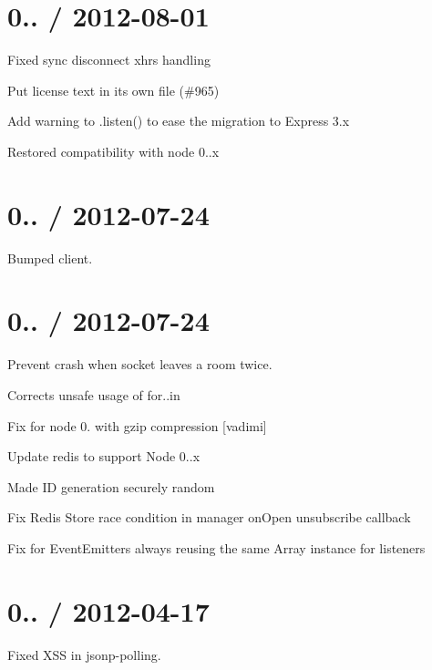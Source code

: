 \section*{0.. / 2012-\/08-\/01 }


\begin{DoxyItemize}
\item Fixed sync disconnect xhrs handling
\item Put license text in its own file (\#965)
\item Add warning to .listen() to ease the migration to Express 3.\+x
\item Restored compatibility with node 0..\+x
\end{DoxyItemize}

\section*{0.. / 2012-\/07-\/24 }


\begin{DoxyItemize}
\item Bumped client.
\end{DoxyItemize}

\section*{0.. / 2012-\/07-\/24 }


\begin{DoxyItemize}
\item Prevent crash when socket leaves a room twice.
\item Corrects unsafe usage of for..in
\item Fix for node 0. with {\ttfamily gzip compression} \mbox{[}vadimi\mbox{]}
\item Update redis to support Node 0..\+x
\item Made ID generation securely random
\item Fix Redis Store race condition in manager on\+Open unsubscribe callback
\item Fix for Event\+Emitters always reusing the same Array instance for listeners
\end{DoxyItemize}

\section*{0.. / 2012-\/04-\/17 }


\begin{DoxyItemize}
\item Fixed X\+SS in jsonp-\/polling.
\end{DoxyItemize}

